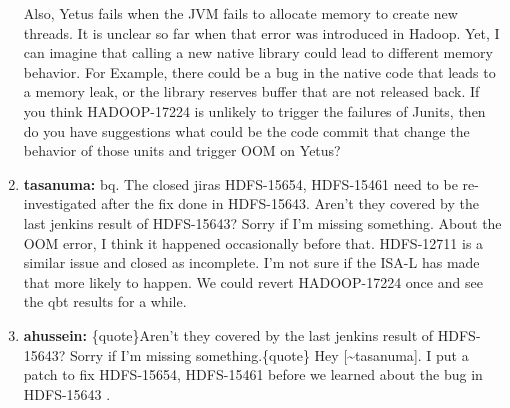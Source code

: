 \documentclass{report}%
\begin{document}
\begin{enumerate}
\newline%
\newline%
\newline%
Also, Yetus fails when the JVM fails to allocate memory to create new threads. It is unclear so far when that error was introduced in Hadoop. Yet, I can imagine that calling a new native library could lead to different memory behavior.\newline%
\newline%
For Example, there could be a bug in the native code that leads to a memory leak, or the library reserves buffer that are not released back.\newline%
\newline%
\newline%
\newline%
If you think HADOOP{-}17224 is unlikely to trigger the failures of Junits, then do you have suggestions what could be the code commit that change the behavior of those units and trigger OOM on Yetus?\newline%
\newline%
%
\item%
\textbf{tasanuma: }bq. The closed jiras HDFS{-}15654, HDFS{-}15461 need to be re{-}investigated after the fix done in HDFS{-}15643.\newline%
\newline%
\newline%
\newline%
Aren't they covered by the last jenkins result of HDFS{-}15643? Sorry if I'm missing something.\newline%
\newline%
\newline%
\newline%
About the OOM error, I think it happened occasionally before that. HDFS{-}12711 is a similar issue and closed as incomplete. I'm not sure if the ISA{-}L has made that more likely to happen. We could revert HADOOP{-}17224 once and see the qbt results for a while.\newline%
\newline%
%
\item%
\textbf{ahussein: }\{quote\}Aren't they covered by the last jenkins result of HDFS{-}15643? Sorry if I'm missing something.\{quote\}\newline%
\newline%
\newline%
\newline%
Hey {[}\textasciitilde{}tasanuma{]}. I put a patch to fix HDFS{-}15654, HDFS{-}15461  before we learned about the bug in HDFS{-}15643 .\newline%

\end{enumerate}
\end{document}

